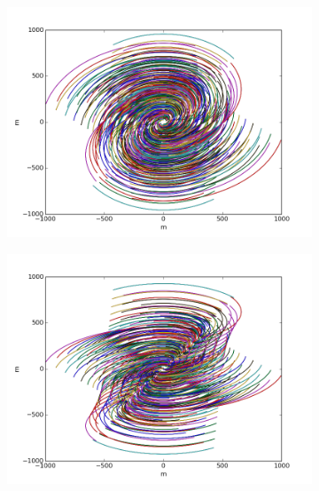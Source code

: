 \begin{figure}[h]
\begin{mdframed}
\begin{subfigure}[b]{0.3\textwidth}
  \includegraphics[width=\textwidth]{images/evla_observation/6hr_dec60.png}
  \caption{}
 \end{subfigure}
 \begin{subfigure}[b]{0.3\textwidth}
  \includegraphics[width=\textwidth]{images/evla_observation/6hr_dec30.png}
  \caption{}
 \end{subfigure}
 \begin{subfigure}[b]{0.3\textwidth}

\end{subfigure}
\end{mdframed}
\end{figure}
